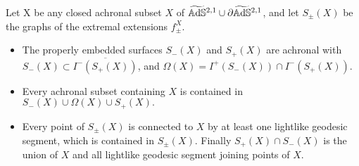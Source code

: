 \begin{lemma}\label{422}
    Let X be any closed achronal subset $X$ of $\widetilde{\mathbb{A}\mathrm{d}\mathbb{S}}{}^{2,1}\cup\partial\widetilde{\mathbb{A}\mathrm{d}\mathbb{S}}{}^{2,1}$, and let $S_\pm(X)$ be the graphs of the extremal extensions $f_\pm^X$. 
    \begin{itemize}
        \item The properly embedded surfaces $S_-(X)$ and $S_+(X)$ are achronal with $S_-(X)\subset \overline{I^-(S_+(X))}$, and $\Omega(X)=I^+(S_-(X))\cap I^-(S_+(X)).$
        \item Every achronal subset containing $X$ is contained in $S_-(X)\cup\Omega(X)\cup S_+(X).$
        \item Every point of $S_\pm(X)$ is connected to $X$ by at least one lightlike geodesic segment, which is contained in $S_\pm(X).$ Finally $S_+(X)\cap S_-(X)$ is the union of $X$ and all lightlike geodesic segment joining points of $X$.
    \end{itemize}
\end{lemma}
